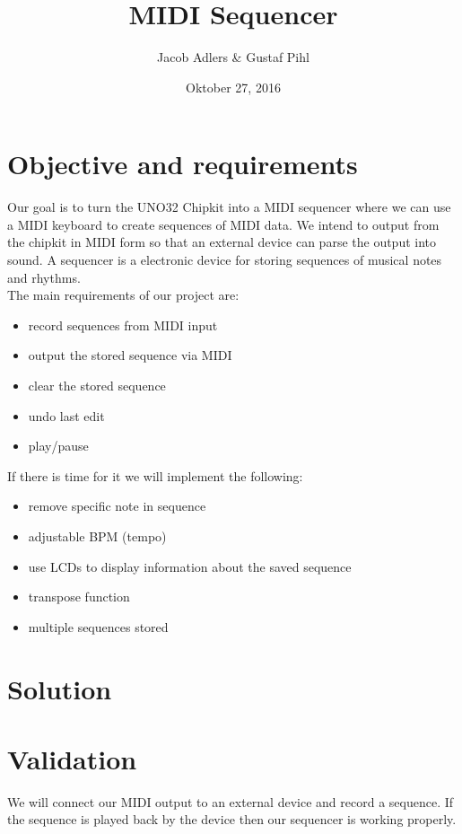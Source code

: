 \documentclass[a4paper,10pt]{article}
\title{MIDI Sequencer}
\author{Jacob Adlers & Gustaf Pihl}
\date{Oktober 27, 2016}
\begin{document}
\maketitle

\section{Objective and requirements}
Our goal is to turn the UNO32 Chipkit into a MIDI sequencer where we can use a MIDI keyboard to create sequences of MIDI data. We intend to output from the chipkit in MIDI form so that an external device can parse the output into sound. A sequencer is a electronic device for storing sequences of musical notes and rhythms.\\

The main requirements of our project are:
\begin{itemize}
  \item record sequences from MIDI input
  \item output the stored sequence via MIDI
  \item clear the stored sequence
  \item undo last edit
  \item play/pause
\end{itemize}

If there is time for it we will implement the following:
\begin{itemize}
  \item remove specific note in sequence
  \item adjustable BPM (tempo)
  \item use LCDs to display information about the saved sequence
  \item transpose function
  \item multiple sequences stored
\end{itemize}

\section{Solution}


\section{Validation}
We will connect our MIDI output to an external device and record a sequence. If the sequence is played back by the device then our sequencer is working properly.
\end{document}
